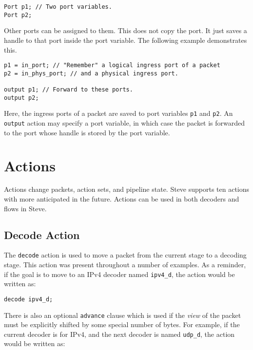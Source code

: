 \begin{codepage}
\begin{lstlisting}
Port p1; // Two port variables.
Port p2;
\end{lstlisting}
\end{codepage}

Other ports can be assigned to them. This does not copy the port. It just saves
a handle to that port inside the port variable. The following example demonstrates this.

\begin{codepage}
\begin{lstlisting}
p1 = in_port; // "Remember" a logical ingress port of a packet
p2 = in_phys_port; // and a physical ingress port.

output p1; // Forward to these ports.
output p2;
\end{lstlisting}
\end{codepage}

Here, the ingress ports of a packet are saved to port variables \texttt{p1} and \texttt{p2}. An \texttt{output} action may specify a port variable, in which case the packet is forwarded to the port whose handle is stored by the port variable.

\section{Actions} \label{tut:action}

Actions change packets, action sets, and pipeline state. Steve supports ten
actions with more anticipated in the future. Actions can be used in both
decoders and flows in Steve.

\subsection{Decode Action} \label{tut:decode_action}

The \texttt{decode} action is used to move a packet from the current stage to a
decoding stage. This action was present throughout a number of examples. As a
reminder, if the goal is to move to an IPv4 decoder named \texttt{ipv4\_d}, the
action would be written as:

\begin{lstlisting}
decode ipv4_d;
\end{lstlisting}

There is also an optional \texttt{advance} clause which is used if
the \textit{view} of the packet must be explicitly shifted by some special
number of bytes. For example, if the current decoder is for IPv4, and the next
decoder is named \texttt{udp\_d}, the action would be written as:

